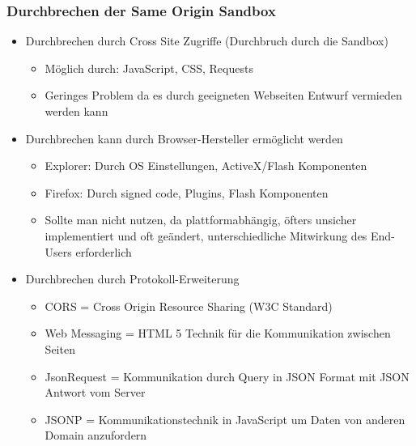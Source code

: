 \documentclass{article} %
\begin{document}
	\subsubsection{Durchbrechen der Same Origin Sandbox}
	\begin{itemize}
		\item Durchbrechen durch Cross Site Zugriffe (Durchbruch durch die Sandbox)
		\begin{itemize} 
			\item Möglich durch: JavaScript, CSS, Requests
			\item Geringes Problem da es durch geeigneten Webseiten Entwurf vermieden werden kann
		\end{itemize}
		\item Durchbrechen kann durch Browser-Hersteller ermöglicht werden
		\begin{itemize}
			\item Explorer: Durch OS Einstellungen, ActiveX/Flash Komponenten
			\item Firefox: Durch signed code, Plugins, Flash Komponenten
			\item Sollte man nicht nutzen, da plattformabhängig, öfters unsicher implementiert und oft geändert, unterschiedliche Mitwirkung des End-Users erforderlich
		\end{itemize}
		\item Durchbrechen durch Protokoll-Erweiterung
		\begin{itemize}
			\item CORS = Cross Origin Resource Sharing (W3C Standard)
			\item Web Messaging = HTML 5 Technik für die Kommunikation zwischen Seiten
			\item JsonRequest = Kommunikation durch Query in JSON Format mit JSON Antwort vom Server
			\item JSONP = Kommunikationstechnik in JavaScript um Daten von anderen Domain anzufordern
		\end{itemize}
	\end{itemize}
\end{document}
